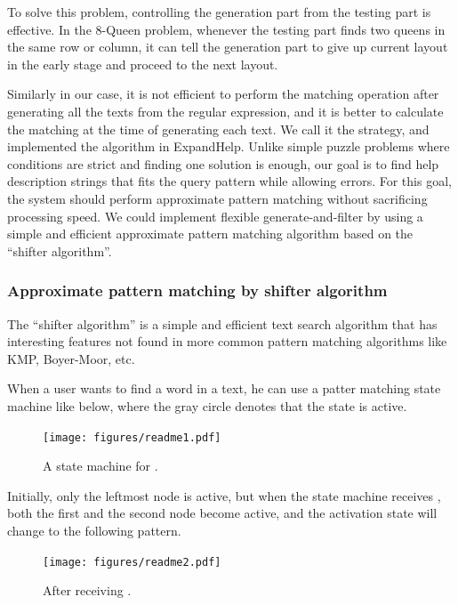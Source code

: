 \documentclass[manuscript,screen,review]{acmart}
\def\EH{\textsf{ExpandHelp}}
\begin{document}
To solve this problem,
controlling the generation part from the testing part is effective.
In the 8-Queen problem,
whenever the testing part finds two queens in the same row or column,
it can tell the generation part to
give up current layout in the early stage and proceed to the next layout.

Similarly in our case,
it is not efficient to perform the matching operation
after generating all the texts from the regular expression,
and it is better to calculate the matching
at the time of generating each text.
We call it the  strategy,
and implemented the algorithm in {\EH}.
Unlike simple puzzle problems where
conditions are strict and finding one solution is enough,
our goal is to find help description strings
that fits the query pattern while allowing errors.
For this goal,
the system should perform approximate pattern matching
without sacrificing processing speed.
%
We could implement flexible generate-and-filter by using a simple and efficient
approximate pattern matching algorithm based on the ``shifter algorithm''.

\subsubsection{Approximate pattern matching by shifter algorithm}

The ``shifter algorithm''\cite{Wu:1992:FTS:135239.135244}
is a simple and efficient
text search algorithm that has interesting features
not found in more common pattern matching algorithms like
KMP\cite{KMP}, Boyer-Moor\cite{Boyer:1977:FSS:359842.359859}, etc.

When a user wants to find a word  in a text,
he can use a patter matching state machine like below,
where the gray circle denotes that the state is active.

\begin{figure}[h]
  \centerline{\texttt{[image: figures/readme1.pdf]}}
  \caption{A state machine for .}
  \label{readme1}
\end{figure}

Initially, only the leftmost node is active, but when the
state machine receives , both the first and the second node become active,
and the activation state will change to the following pattern.

\begin{figure}[h]
  \centerline{\texttt{[image: figures/readme2.pdf]}}
  \caption{After receiving .}
  \label{readme2}
\end{figure}
\end{document}
